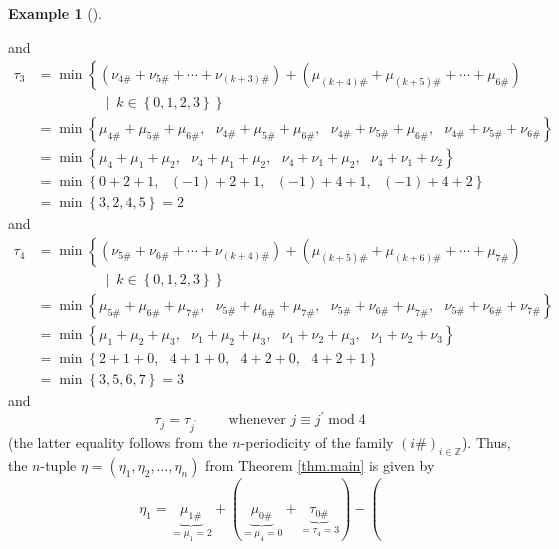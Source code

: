 \documentclass[numbers=enddot,12pt,final,onecolumn,notitlepage]{scrartcl}%
\theoremstyle{definition}
\newtheorem{exam}[theo]{Example}
\newenvironment{example}[1][]
{\begin{exam}[#1]\begin{leftbar}}
{\end{leftbar}\end{exam}}
\begin{document}
\begin{example}
and%
\begin{align*}
\tau_{3}  &  =\min\left\{  \left(  \nu_{4\#}+\nu_{5\#}+\cdots+\nu_{\left(
k+3\right)  \#}\right)  +\left(  \mu_{\left(  k+4\right)  \#}+\mu_{\left(
k+5\right)  \#}+\cdots+\mu_{6\#}\right)  \right. \\
&  \ \ \ \ \ \ \ \ \ \ \ \ \ \ \ \ \ \ \ \ \left.  \ \mid\ k\in\left\{
0,1,2,3\right\}  \right\} \\
&  =\min\left\{  \mu_{4\#}+\mu_{5\#}+\mu_{6\#},\ \ \ \nu_{4\#}+\mu_{5\#}%
+\mu_{6\#},\ \ \ \nu_{4\#}+\nu_{5\#}+\mu_{6\#},\ \ \ \nu_{4\#}+\nu_{5\#}%
+\nu_{6\#}\right\} \\
&  =\min\left\{  \mu_{4}+\mu_{1}+\mu_{2},\ \ \ \nu_{4}+\mu_{1}+\mu
_{2},\ \ \ \nu_{4}+\nu_{1}+\mu_{2},\ \ \ \nu_{4}+\nu_{1}+\nu_{2}\right\} \\
&  =\min\left\{  0+2+1,\ \ \ \left(  -1\right)  +2+1,\ \ \ \left(  -1\right)
+4+1,\ \ \ \left(  -1\right)  +4+2\right\} \\
&  =\min\left\{  3,2,4,5\right\}  =2
\end{align*}
and%
\begin{align*}
\tau_{4}  &  =\min\left\{  \left(  \nu_{5\#}+\nu_{6\#}+\cdots+\nu_{\left(
k+4\right)  \#}\right)  +\left(  \mu_{\left(  k+5\right)  \#}+\mu_{\left(
k+6\right)  \#}+\cdots+\mu_{7\#}\right)  \right. \\
&  \ \ \ \ \ \ \ \ \ \ \ \ \ \ \ \ \ \ \ \ \left.  \ \mid\ k\in\left\{
0,1,2,3\right\}  \right\} \\
&  =\min\left\{  \mu_{5\#}+\mu_{6\#}+\mu_{7\#},\ \ \ \nu_{5\#}+\mu_{6\#}%
+\mu_{7\#},\ \ \ \nu_{5\#}+\nu_{6\#}+\mu_{7\#},\ \ \ \nu_{5\#}+\nu_{6\#}%
+\nu_{7\#}\right\} \\
&  =\min\left\{  \mu_{1}+\mu_{2}+\mu_{3},\ \ \ \nu_{1}+\mu_{2}+\mu
_{3},\ \ \ \nu_{1}+\nu_{2}+\mu_{3},\ \ \ \nu_{1}+\nu_{2}+\nu_{3}\right\} \\
&  =\min\left\{  2+1+0,\ \ \ 4+1+0,\ \ \ 4+2+0,\ \ \ 4+2+1\right\} \\
&  =\min\left\{  3,5,6,7\right\}  =3
\end{align*}
and%
\[
\tau_{j}=\tau_{j^{\prime}}\ \ \ \ \ \ \ \ \ \ \text{whenever }j\equiv
j^{\prime}\operatorname{mod}4
\]
(the latter equality follows from the $n$-periodicity of the family $\left(
i\#\right)  _{i\in\mathbb{Z}}$). Thus, the $n$-tuple $\eta=\left(  \eta
_{1},\eta_{2},\ldots,\eta_{n}\right)  $ from Theorem \ref{thm.main} is given
by%
\[
\eta_{1}=\underbrace{\mu_{1\#}}_{=\mu_{1}=2}+\left(  \underbrace{\mu_{0\#}%
}_{=\mu_{4}=0}+\underbrace{\tau_{0\#}}_{=\tau_{4}=3}\right)  -\left(
\]
\end{example}
\end{document}
